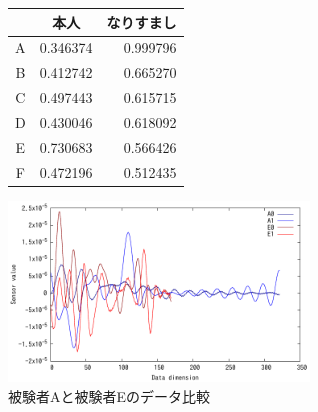 \begin{figure}[!tb]
  \def\@captype{table}
  \begin{minipage}{.48\textwidth}
    \centering
    \label{auth-result}
    \begin{tabular}{|c|r|r|} \hline
      \multicolumn{1}{|c|}{}  & \multicolumn{1}{c|}{本人} & \multicolumn{1}{c|}{なりすまし} \\ \hline \hline
      A & 0.346374 & 0.999796 \\ \hline
      B & 0.412742 & 0.665270 \\ \hline
      C & 0.497443 & 0.615715 \\ \hline
      D & 0.430046 & 0.618092 \\ \hline
      E & 0.730683 & 0.566426 \\ \hline
      F & 0.472196 & 0.512435 \\ \hline
    \end{tabular}
  \end{minipage}
  \hfill
  \begin{minipage}{.48\textwidth}
    \centering
    \includegraphics[bb=0 0 360 216, width=8cm]{Graphs/comp_AE.pdf}
    \caption{被験者Aと被験者Eのデータ比較}
    \label{compare}
  \end{minipage}
\end{figure}
